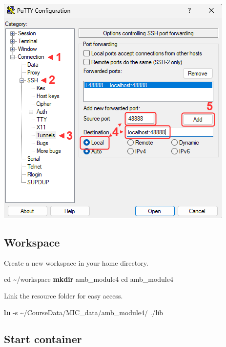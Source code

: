 \documentclass[
]{book}
\newenvironment{Shaded}{\begin{snugshade}}{\end{snugshade}}
\newcommand{\AttributeTok}[1]{\textcolor[rgb]{0.13,0.29,0.53}{#1}}
\newcommand{\BuiltInTok}[1]{#1}
\newcommand{\FunctionTok}[1]{\textcolor[rgb]{0.13,0.29,0.53}{\textbf{#1}}}
\newcommand{\NormalTok}[1]{#1}
\begin{document}
\includegraphics{img/lab3/putty_port_forward.png}

\subsection{Workspace}\label{workspace-1}

Create a new workspace in your home directory.

\begin{Shaded}
\begin{Highlighting}[]
\BuiltInTok{cd}\NormalTok{ \textasciitilde{}/workspace}
\FunctionTok{mkdir}\NormalTok{ amb\_module4}
\BuiltInTok{cd}\NormalTok{ amb\_module4}
\end{Highlighting}
\end{Shaded}

Link the resource folder for easy access.

\begin{Shaded}
\begin{Highlighting}[]
\FunctionTok{ln} \AttributeTok{{-}s}\NormalTok{ \textasciitilde{}/CourseData/MIC\_data/amb\_module4/ ./lib}
\end{Highlighting}
\end{Shaded}

\subsection{Start container}\label{start-container-1}
\end{document}
